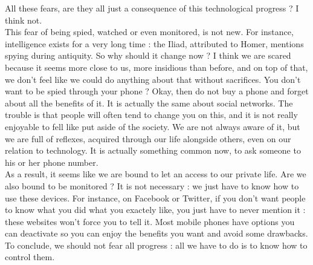 \documentclass{article}
\begin{document}
\bigskip
All these fears, are they all just a consequence of this technological progress ? I think not.\\
This fear of being spied, watched or even monitored, is not new. For instance, intelligence exists for a very long time : the Iliad, attributed to Homer, mentions spying during antiquity. So why should it change now ? I think we are scared because it seems more close to us, more insidious than before, and on top of that, we don't feel like we could do anything about that without sacrifices. 
You don't want to be spied through your phone ? Okay, then do not buy a phone and forget about all the benefits of it. It is actually the same about social networks. The trouble is that people will often tend to change you on this, and it is not really enjoyable to fell like put aside of the society. We are not always aware of it, but we are full of reflexes, acquired through our life alongside others, even on our relation to technology. It is actually something common now, to ask someone to his or her phone number.\\
As a result, it seems like we are bound to let an access to our private life. Are we also bound to be monitored ? It is not necessary : we just have to know how to use these devices. For instance, on Facebook or Twitter, if you don't want people to know what you did what you exactely like, you just have to never mention it : these websites won't force you to tell it. Most mobile phones have options you can deactivate so you can enjoy the benefits you want and avoid some drawbacks.\\
To conclude, we should not fear all progress : all we have to do is to know how to control them.  
 
\end{document}
